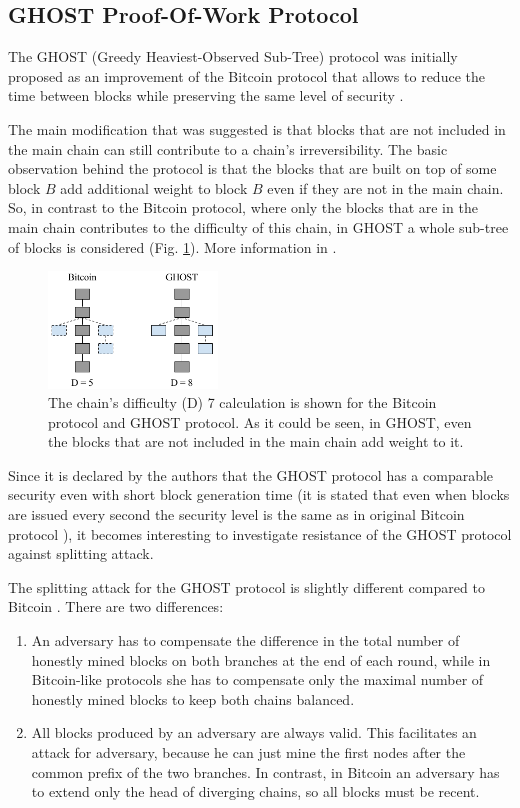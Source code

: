 \documentclass[10pt,a4paper]{article}
\numberwithin{equation}{section} %
\theoremstyle{plain}
\theoremstyle{definition}
\theoremstyle{remark}
\begin{document}
	
	\subsection{GHOST Proof-Of-Work Protocol}
	
    The GHOST (Greedy Heaviest-Observed Sub-Tree) protocol was initially proposed as an improvement of the Bitcoin protocol that allows to reduce the time between blocks while preserving the same level of security \cite{ZS13, ZS15}.
    
    The main modification that was suggested is that blocks that are not included in the main chain can still contribute to a chain's irreversibility. The basic observation behind the protocol is that the blocks that are built on top of some block \(B\) add additional weight to block \(B\) even if they are not in the main chain. So, in contrast to the Bitcoin protocol, where only the blocks that are in the main chain contributes to the difficulty of this chain, in GHOST a whole sub-tree of blocks is considered (Fig. \ref{fig:btc_vs_ghost}). More information in \cite{ZS13,ZS15}.
    
    \begin{figure}[]
        \centering
        \includegraphics[width=0.4\textwidth]{btc_vs_ghost}
        \caption{The chain's difficulty (D) 7 calculation is shown for the Bitcoin protocol and GHOST protocol. As it could be seen, in GHOST, even the blocks that are not included in the main chain add weight to it.}
        \label{fig:btc_vs_ghost}
    \end{figure}
	
	Since it is declared by the authors that the GHOST protocol has a comparable security even with short block generation time (it is stated that even when blocks are issued every second the security level is the same as in original Bitcoin protocol \cite{ZS13}), it becomes interesting to investigate resistance of the GHOST protocol against splitting attack.
	
	The splitting attack for the GHOST protocol is slightly different compared to Bitcoin \cite{KP15}. There are two differences:
	\begin{enumerate}
    	\item An adversary has to compensate the difference in the total number of honestly mined blocks on both branches at the end of each round, while in Bitcoin-like protocols she has to compensate only the maximal number of honestly mined blocks to keep both chains balanced.
    	\item All blocks produced by an adversary are always valid. This facilitates an attack for adversary, because he can just mine the first nodes after the common prefix of the two branches. In contrast, in Bitcoin an adversary has to extend only the head of diverging chains, so all blocks must be recent. 
	\end{enumerate}
	
\end{document}
